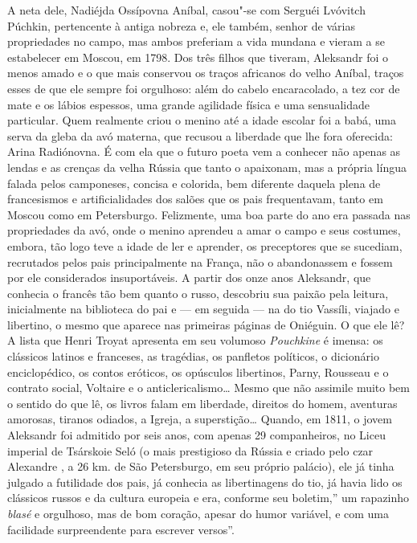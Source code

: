 A neta dele, Nadiéjda Ossípovna Aníbal, casou"-se com Serguéi Lvóvitch
Púchkin, pertencente à antiga nobreza e, ele também, senhor de várias
propriedades no campo, mas ambos preferiam a vida mundana e vieram a se
estabelecer em Moscou, em 1798. Dos três filhos que tiveram, Aleksandr
foi o menos amado e o que mais conservou os traços africanos do velho
Aníbal, traços esses de que ele sempre foi orgulhoso: além do cabelo
encaracolado, a tez cor de mate e os lábios espessos, uma grande
agilidade física e uma sensualidade particular. Quem realmente criou o
menino até a idade escolar foi a babá, uma serva da gleba da avó
materna, que recusou a liberdade que lhe fora oferecida: Arina
Radiónovna. É com ela que o futuro poeta vem a conhecer não apenas as
lendas e as crenças da velha Rússia que tanto o apaixonam, mas a própria
língua falada pelos camponeses, concisa e colorida, bem diferente
daquela plena de francesismos e artificialidades dos salões que os pais
frequentavam, tanto em Moscou como em Petersburgo. Felizmente, uma boa
parte do ano era passada nas propriedades da avó, onde o menino aprendeu
a amar o campo e seus costumes, embora, tão logo teve a idade de ler e
aprender, os preceptores que se sucediam, recrutados pelos pais
principalmente na França, não o abandonassem e fossem por ele
considerados insuportáveis. A partir dos onze anos Aleksandr, que
conhecia o francês tão bem quanto o russo, descobriu sua paixão pela
leitura, inicialmente na biblioteca do pai e --- em seguida --- na do tio
Vassíli, viajado e libertino, o mesmo que aparece nas primeiras páginas
de Oniéguin. O que ele lê? A lista que Henri Troyat apresenta em seu
volumoso \emph{Pouchkine} é imensa: os clássicos latinos e franceses, as
tragédias, os panfletos políticos, o dicionário enciclopédico, os
contos eróticos, os opúsculos libertinos, Parny, Rousseau e o contrato
social, Voltaire e o anticlericalismo\ldots{} Mesmo que não assimile muito
bem o sentido do que lê, os livros falam em liberdade, direitos do
homem, aventuras amorosas, tiranos odiados, a Igreja, a superstição\ldots{}
Quando, em 1811, o jovem Aleksandr foi admitido por seis anos, com apenas
29 companheiros, no Liceu imperial de Tsárskoie Seló (o mais
prestigioso da Rússia e criado pelo czar Alexandre , a 26 km. de São
Petersburgo, em seu próprio palácio), ele já tinha julgado a futilidade
dos pais, já conhecia as libertinagens do tio, já havia lido os
clássicos russos e da cultura europeia e era, conforme seu boletim,'' um
rapazinho \emph{blasé} e orgulhoso, mas de bom coração, apesar do humor
variável, e com uma facilidade surpreendente para escrever versos''.
